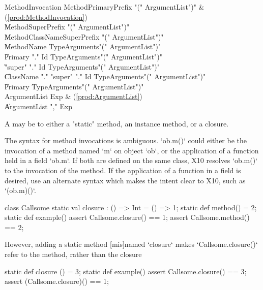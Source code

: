 \begin{bbgrammar}
    MethodInvocation \: MethodPrimaryPrefix \xcd"(" ArgumentList\opt \xcd")" & (\ref{prod:MethodInvocation}) \\
                    \| MethodSuperPrefix \xcd"(" ArgumentList\opt \xcd")" \\
                    \| MethodClassNameSuperPrefix \xcd"(" ArgumentList\opt \xcd")" \\
                    \| MethodName TypeArguments\opt \xcd"(" ArgumentList\opt \xcd")" \\
                    \| Primary \xcd"." Id TypeArguments\opt \xcd"(" ArgumentList\opt \xcd")" \\
                    \| \xcd"super" \xcd"." Id TypeArguments\opt \xcd"(" ArgumentList\opt \xcd")" \\
                    \| ClassName \xcd"." \xcd"super"  \xcd"." Id TypeArguments\opt \xcd"(" ArgumentList\opt \xcd")" \\
                    \| Primary TypeArguments\opt \xcd"(" ArgumentList\opt \xcd")" \\
        ArgumentList \: Exp & (\ref{prod:ArgumentList}) \\
                    \| ArgumentList \xcd"," Exp \\
\end{bbgrammar}


A  may be to either a \xcd"static" method, an
instance method, or a closure.


The syntax for method invocations is ambiguous. \xcd`ob.m()` could either be
the invocation of a method named \xcd`m` on object \xcd`ob`, or the
application of a function held in a field \xcd`ob.m`.   If both are defined on
the same class, X10 resolves \xcd`ob.m()` to the invocation of the 
method.  If the application of a function in a field is desired, use
an alternate syntax which makes the intent clear to X10, such as
\xcd`(ob.m)()`. 

\begin{ex}
\begin{xten}
class Callsome {
  static val closure : () => Int = () => 1;
  static def method()            = 2;
  static def example() {
     assert Callsome.closure() == 1;
     assert Callsome.method()  == 2;
  } 
}
\end{xten}
However, adding a static method [mis]named \xcd`closure` makes
\xcd`Callsome.closure()` 
refer to the method, rather than the closure
\begin{xten}
  static def closure () = 3;
  static def example() {
     assert Callsome.closure() == 3;
     assert (Callsome.closure)() == 1;
  }
\end{xten}
\end{ex}

